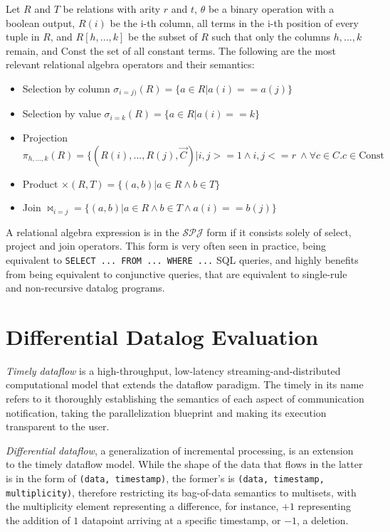 \documentclass[sigconf,screen,review,natbib]{acmart}
\theoremstyle{definition}
\begin{document}
Let $R$ and $T$ be relations with arity $r$ and $t$, $\theta$ be a binary operation with a boolean output, $R(i)$ be
the i-th column, all terms in the i-th position of every tuple in $R$, and $R[h, ..., k]$ be the subset of $R$ such
that only the columns $h, ..., k$ remain, and Const the set of all constant terms. The following are the most
relevant relational algebra operators and their semantics:
\begin{itemize}
	\item Selection by column $\sigma_{i=j)}(R) = \{ a \in R | a(i) == a(j) \}$
	\item Selection by value $\sigma_{i=k}(R) = \{a \in R | a(i) == k \}$
	\item Projection $\pi_{h, ..., k}(R) = \{(R(i), ..., R(j), \overrightarrow{C}) |  i, j >= 1 \wedge i, j <= r\ \wedge \forall c \in C. c \in \text{Const}$
	\item Product $\times(R, T) = \{(a, b) | a \in R \wedge b \in T \}$
	\item Join $\Join_{i=j} = \{(a, b) | a \in R \wedge b \in T \wedge a(i) == b(j)\}$
\end{itemize}

A relational algebra expression is in the $\mathcal{SPJ}$ form if it consists solely of select, project and join
operators. This form is very often seen in practice, being equivalent to \verb|SELECT ... FROM ... WHERE ...| SQL
queries, and highly benefits from being equivalent to conjunctive queries, that are equivalent to single-rule and
non-recursive datalog programs.

\section{Differential Datalog Evaluation}

\emph{Timely dataflow} is a high-throughput, low-latency
streaming-and-distributed computational model that extends the dataflow paradigm. The timely
in its name refers to it thoroughly establishing the semantics of each aspect of communication
notification, taking the parallelization blueprint and making its execution transparent to the user.

\emph{Differential dataflow}, a generalization of incremental processing, is an extension to the
timely dataflow model. While the shape of the data that flows in the latter is in the form
of \verb|(data, timestamp)|, the former's is \verb|(data, timestamp, multiplicity)|, therefore
restricting its bag-of-data semantics to multisets, with the multiplicity element representing a
difference, for instance, $+1$ representing the addition of $1$ datapoint arriving at a
specific timestamp, or $-1$, a deletion.
\end{document}
